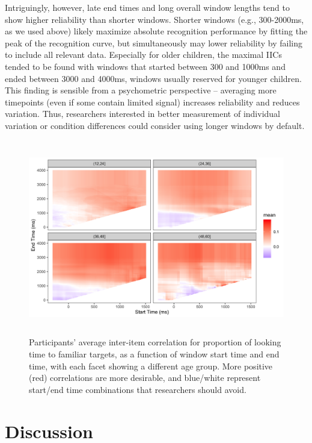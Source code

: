 \documentclass[10pt, letterpaper]{article}
\begin{document}
Intriguingly, however, late end times and long overall window lengths
tend to show higher reliability than shorter windows. Shorter windows
(e.g., 300-2000ms, as we used above) likely maximize absolute
recognition performance by fitting the peak of the recognition curve,
but simultaneously may lower reliability by failing to include all
relevant data. Especially for older children, the maximal IICs tended to
be found with windows that started between 300 and 1000ms and ended
between 3000 and 4000ms, windows usually reserved for younger children.
This finding is sensible from a psychometric perspective -- averaging
more timepoints (even if some contain limited signal) increases
reliability and reduces variation. Thus, researchers interested in
better measurement of individual variation or condition differences
could consider using longer windows by default.

\begin{figure} 
\includegraphics[width=13.6cm,height=8.5cm]{../figures/interitem_cors_window_analysis.png}
\caption{Participants' average inter-item correlation for proportion of looking time to familiar targets, as a function of window start time and end time, with each facet showing a different age group. More positive (red) correlations are more desirable, and blue/white represent start/end time combinations that researchers should avoid.}
\label{fig:time_window}
\end{figure}

\hypertarget{discussion}{%
\section{Discussion}\label{discussion}}
\end{document}
